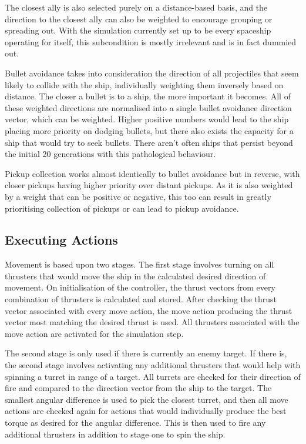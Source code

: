 \documentclass[a4paper]{article}
\begin{document}
The closest ally is also selected purely on a distance-based basis, and the direction to the closest ally can also be weighted to encourage grouping or spreading out. With the simulation currently set up to be every spaceship operating for itself, this subcondition is mostly irrelevant and is in fact dummied out.

Bullet avoidance takes into consideration the direction of all projectiles that seem likely to collide with the ship, individually weighting them inversely based on distance. The closer a bullet is to a ship, the more important it becomes. All of these weighted directions are normalised into a single bullet avoidance direction vector, which can be weighted. Higher positive numbers would lead to the ship placing more priority on dodging bullets, but there also exists the capacity for a ship that would try to seek bullets. There aren't often ships that persist beyond the initial 20 generations with this pathological behaviour.

Pickup collection works almost identically to bullet avoidance but in reverse, with closer pickups having higher priority over distant pickups. As it is also weighted by a weight that can be positive or negative, this too can result in greatly prioritising collection of pickups or can lead to pickup avoidance.

\subsection{Executing Actions}

Movement is based upon two stages. The first stage involves turning on all thrusters that would move the ship in the calculated desired direction of movement. On initialisation of the controller, the thrust vectors from every combination of thrusters is calculated and stored. After checking the thrust vector associated with every move action, the move action producing the thrust vector most matching the desired thrust is used. All thrusters associated with the move action are activated for the simulation step.

The second stage is only used if there is currently an enemy target. If there is, the second stage involves activating any additional thrusters that would help with spinning a turret in range of a target. All turrets are checked for their direction of fire and compared to the direction vector from the ship to the target. The smallest angular difference is used to pick the closest turret, and then all move actions are checked again for actions that would individually produce the best torque as desired for the angular difference. This is then used to fire any additional thrusters in addition to stage one to spin the ship.
\end{document}

